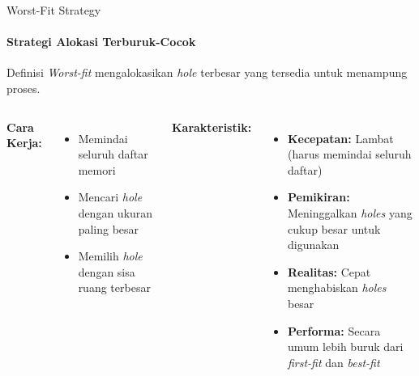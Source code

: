 \documentclass[10pt,aspectratio=169]{beamer}
\begin{document}
\begin{frame}{Worst-Fit Strategy}
    \framesubtitle{Strategi Alokasi Terburuk-Cocok}
    
    \begin{block}{Definisi}
        \textit{Worst-fit} mengalokasikan \textit{hole} terbesar yang tersedia untuk menampung proses.
    \end{block}
    
    \begin{columns}[T]
            \textbf{Cara Kerja:}
            \begin{itemize}
                \item Memindai seluruh daftar memori
                \item Mencari \textit{hole} dengan ukuran paling besar
                \item Memilih \textit{hole} dengan sisa ruang terbesar
            \end{itemize}
            
            \textbf{Karakteristik:}
            \begin{itemize}
                \item \textbf{Kecepatan:} Lambat (harus memindai seluruh daftar)
                \item \textbf{Pemikiran:} Meninggalkan \textit{holes} yang cukup besar untuk digunakan
                \item \textbf{Realitas:} Cepat menghabiskan \textit{holes} besar
                \item \textbf{Performa:} Secara umum lebih buruk dari \textit{first-fit} dan \textit{best-fit}
            \end{itemize}
    \end{columns}
\end{frame}
\end{document}
